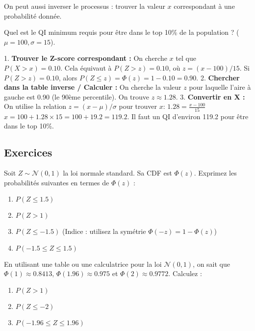 On peut aussi inverser le processus : trouver la valeur $x$ correspondant à une probabilité donnée.

\begin{examplebox}
Quel est le QI minimum requis pour être dans le top 10\% de la population ? ($\mu=100, \sigma=15$).

1.  \textbf{Trouver le Z-score correspondant :} On cherche $x$ tel que $P(X > x) = 0.10$. Cela équivaut à $P(Z > z) = 0.10$, où $z = (x-100)/15$.
    Si $P(Z > z) = 0.10$, alors $P(Z \le z) = \Phi(z) = 1 - 0.10 = 0.90$.
2.  \textbf{Chercher dans la table inverse / Calculer :} On cherche la valeur $z$ pour laquelle l'aire à gauche est 0.90 (le 90ème percentile). On trouve $z \approx 1.28$.
3.  \textbf{Convertir en X :} On utilise la relation $z = (x-\mu)/\sigma$ pour trouver $x$:
    $1.28 = \frac{x - 100}{15}$
    $x = 100 + 1.28 \times 15 = 100 + 19.2 = 119.2$.
    Il faut un QI d'environ 119.2 pour être dans le top 10\%.
\end{examplebox}

\subsection{Exercices}


\begin{exercicebox}
Soit $Z \sim \mathcal{N}(0, 1)$ la loi normale standard. Sa CDF est $\Phi(z)$.
Exprimez les probabilités suivantes en termes de $\Phi(z)$ :
\begin{enumerate}
    \item $P(Z \le 1.5)$
    \item $P(Z > 1)$
    \item $P(Z \le -1.5)$ (Indice : utilisez la symétrie $\Phi(-z) = 1 - \Phi(z)$)
    \item $P(-1.5 \le Z \le 1.5)$
\end{enumerate}
\end{exercicebox}

\begin{exercicebox}
En utilisant une table ou une calculatrice pour la loi $\mathcal{N}(0, 1)$, on sait que $\Phi(1) \approx 0.8413$, $\Phi(1.96) \approx 0.975$ et $\Phi(2) \approx 0.9772$.
Calculez :
\begin{enumerate}
    \item $P(Z > 1)$
    \item $P(Z \le -2)$
    \item $P(-1.96 \le Z \le 1.96)$
\end{enumerate}
\end{exercicebox}

